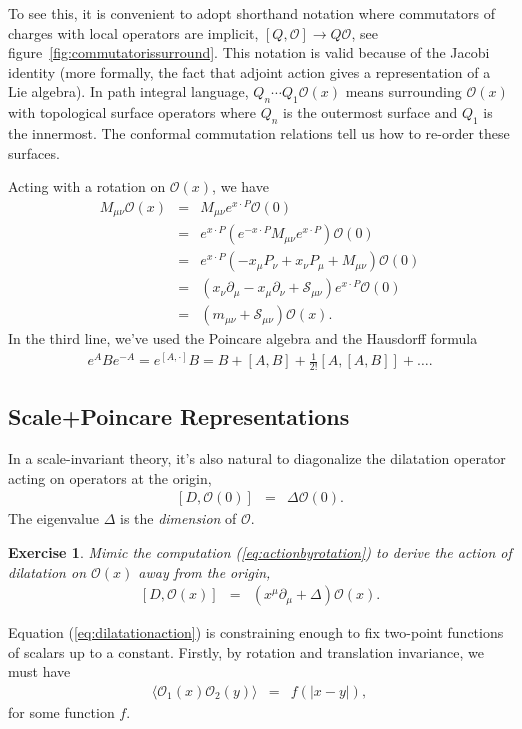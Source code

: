 \documentclass[11pt]{ws-rv9x6}
\newcommand\be{\begin{eqnarray}}
\newcommand\ee{\end{eqnarray}}
\newcommand\cO{\mathcal{O}}
\newcommand\ptl\partial
\newcommand\<\langle
\renewcommand\>\rangle
\newcommand\nn{\nonumber}
\renewcommand\.{\cdot}
\newcommand\cS{\mathcal{S}}
\newtheorem{exercise}{Exercise}[section]
\begin{document}
To see this, it is convenient to adopt shorthand notation where commutators of charges with local operators are implicit, $[Q,\cO] \to Q \cO$, see figure~\ref{fig:commutatorissurround}.  This notation is valid because of the Jacobi identity (more formally, the fact that adjoint action gives a representation of a Lie algebra).  In path integral language, $Q_n\cdots Q_1 \cO(x)$ means surrounding $\cO(x)$ with topological surface operators where $Q_n$ is the outermost surface and $Q_1$ is the innermost.  The conformal commutation relations tell us how to re-order these surfaces.

Acting with a rotation on $\cO(x)$, we have
\be
M_{\mu\nu}\cO(x) &=& M_{\mu\nu}e^{x\.P}\cO(0) \nn\\
&=& e^{x\.P}(e^{-x\.P} M_{\mu\nu} e^{x\.P})\cO(0)\nn\\
&=& e^{x\.P}(-x_\mu P_\nu + x_\nu P_\mu+M_{\mu\nu})\cO(0)\nn\\
&=& (x_\nu \ptl_\mu - x_\mu\ptl_\nu+\cS_{\mu\nu})e^{x\.P}\cO(0)\nn\\
&=& (m_{\mu\nu}+\cS_{\mu\nu})\cO(x).\label{eq:actionbyrotation}
\ee
In the third line, we've used the Poincare algebra and the Hausdorff formula
\be
e^{A}Be^{-A} = e^{[A,\.]}B
= B+[A,B]+\frac 1 {2!}[A,[A,B]]+\dots.
\ee

\subsection{Scale+Poincare Representations}

In a scale-invariant theory, it's also natural to diagonalize the dilatation operator acting on operators at the origin,
\be
\label{eq:dilatationcondition}
[D,\cO(0)]&=&\Delta \cO(0).
\ee
The eigenvalue $\Delta$ is the {\it dimension\/} of $\cO$.
\begin{exercise}
Mimic the computation (\ref{eq:actionbyrotation}) to derive the action of dilatation on $\cO(x)$ away from the origin,
\be
\label{eq:dilatationaction}
[D,\cO(x)] &=& (x^\mu\ptl_\mu + \Delta)\cO(x).
\ee
\end{exercise}

Equation (\ref{eq:dilatationaction}) is constraining enough to fix two-point functions of scalars up to a constant.  Firstly, by rotation and translation invariance, we must have
\be
\<\cO_1(x)\cO_2(y)\>&=&f(|x-y|),
\ee
for some function $f$.
\end{document}

